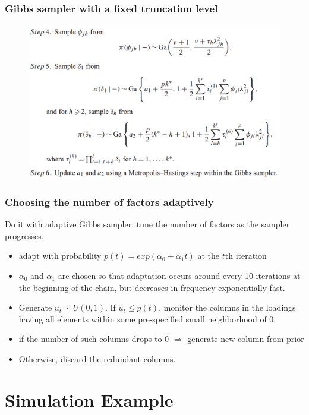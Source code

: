 \documentclass{beamer}
\begin{document}
	
	\begin{frame}
		\frametitle{Gibbs sampler with a fixed truncation level}
		\begin{figure}
			\includegraphics[width=0.9\linewidth]{image003.png}
		\end{figure}	
	\end{frame}
	
	\begin{frame}
		\frametitle{Choosing the number of factors adaptively}
		Do it with adaptive Gibbs sampler: tune the number of factors as the sampler progresses.
		\begin{itemize}
			\item 
			adapt with probability $p(t) = exp(\alpha_0 + \alpha_1 t)$ at the $t$th iteration
			\item
			$\alpha_0$ and $\alpha_1$ are chosen so that adaptation occurs around every 10 iterations at the beginning of the chain, but decreases in frequency exponentially fast.
			\item
			Generate $u_t \sim U(0,1)$. If $u_t \leq p(t)$, monitor the columns in the loadings having all elements within some pre-specified small neighborhood of 0.
			\item
			if the number of such columns drops to 0 $\Rightarrow$ generate new column from prior
			\item
			Otherwise, discard the redundant columns.
			
		\end{itemize}
	\end{frame}
	
	\section{Simulation Example}
	
\end{document}
